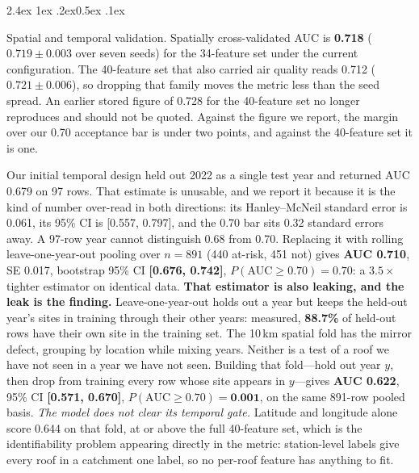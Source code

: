\documentclass[10pt,twocolumn]{article}
\makeatletter
\renewcommand\paragraph{\@startsection{paragraph}{4}{\z@}%
  {2.4ex \@plus1ex \@minus.2ex}{0.5ex \@plus .1ex}%
  {\normalfont\normalsize\bfseries\raggedright}}
\makeatother
\begin{document}
\paragraph{Spatial and temporal validation.}
Spatially cross-validated AUC is \textbf{0.718} ($0.719 \pm 0.003$ over seven seeds) for
the 34-feature set under the current configuration. The 40-feature set that also carried
air quality reads 0.712 ($0.721 \pm 0.006$), so dropping that family moves the metric less
than the seed spread. An earlier stored figure of 0.728 for the 40-feature set no longer
reproduces and should not be quoted. Against the figure we report, the margin over our
0.70 acceptance bar is under two points, and against the 40-feature set it is one.

Our initial temporal design held out 2022 as a single test year and returned AUC 0.679 on
97 rows. That estimate is unusable, and we report it because it is the kind of number
over-read in both directions: its Hanley--McNeil standard error is 0.061, its 95\% CI is
[0.557, 0.797], and the 0.70 bar sits 0.32 standard errors away. A 97-row year cannot
distinguish 0.68 from 0.70. Replacing it with rolling leave-one-year-out pooling over
$n=891$ (440 at-risk, 451 not) gives \textbf{AUC 0.710}, SE 0.017, bootstrap 95\% CI
\textbf{[0.676, 0.742]}, $P(\text{AUC}\geq0.70)=0.70$: a $3.5\times$ tighter estimator on
identical data. \textbf{That estimator is also leaking, and the leak is the finding.}
Leave-one-year-out holds out a year but keeps the held-out year's sites in training
through their other years: measured, \textbf{88.7\%} of held-out rows have their own site
in the training set. The 10\,km spatial fold has the mirror defect, grouping by location
while mixing years. Neither is a test of a roof we have not seen in a year we have not
seen. Building that fold---hold out year $y$, then drop from training every row whose
site appears in $y$---gives \textbf{AUC 0.622}, 95\% CI \textbf{[0.571, 0.670]},
$P(\text{AUC}\geq0.70)=\textbf{0.001}$, on the same 891-row pooled basis. \emph{The model
does not clear its temporal gate.} Latitude and longitude alone score 0.644 on that fold,
at or above the full 40-feature set, which is the identifiability problem appearing
directly in the metric: station-level labels give every roof in a catchment one label, so
no per-roof feature has anything to fit.
\end{document}
